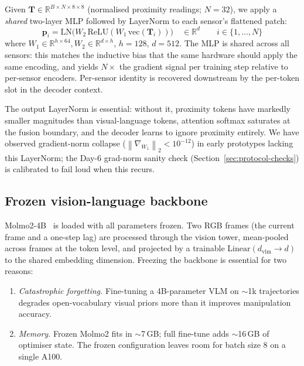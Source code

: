 \documentclass[11pt]{article}
\newcommand{\norm}[1]{\left\lVert#1\right\rVert}
\newcommand{\R}{\mathbb{R}}
\begin{document}
Given $\mathbf{T} \in \R^{B \times N \times 8 \times 8}$ (normalised
proximity readings; $N = 32$), we apply a \emph{shared} two-layer MLP
followed by LayerNorm to each sensor's flattened patch:
\begin{equation}
\mathbf{p}_i = \mathrm{LN}\big(W_2\, \mathrm{ReLU}(W_1\, \mathrm{vec}(\mathbf{T}_i)) \big)
\quad\in\R^{d}
\qquad i \in \{1, \dots, N\}
\end{equation}
where $W_1 \in \R^{h \times 64}, W_2 \in \R^{d \times h}$, $h = 128$,
$d = 512$. The MLP is shared across all sensors: this matches the
inductive bias that the same hardware should apply the same encoding,
and yields $N\times$ the gradient signal per training step relative to
per-sensor encoders. Per-sensor identity is recovered downstream by the
per-token slot in the decoder context.

The output LayerNorm is essential: without it, proximity tokens have
markedly smaller magnitudes than visual-language tokens, attention
softmax saturates at the fusion boundary, and the decoder learns to
ignore proximity entirely. We have observed gradient-norm collapse
($\norm{\nabla_{W_1}}_2 < 10^{-12}$) in early prototypes lacking this
LayerNorm; the Day-6 grad-norm sanity check
(Section~\ref{sec:protocol-checks}) is calibrated to fail loud when this
recurs.

\subsection{Frozen vision-language backbone}
\label{sec:method-vlm}

Molmo2-4B~\citep{molmo2024} is loaded with all parameters frozen. Two
RGB frames (the current frame and a one-step lag) are processed through
the vision tower, mean-pooled across frames at the token level, and
projected by a trainable $\mathrm{Linear}(d_\mathrm{vlm} \to d)$ to the
shared embedding dimension. Freezing the backbone is essential for two
reasons:
\begin{enumerate}[leftmargin=1.5em,topsep=0.2em,itemsep=0.2em]
\item \emph{Catastrophic forgetting.} Fine-tuning a 4B-parameter VLM on
  $\sim$1k trajectories degrades open-vocabulary visual priors more than
  it improves manipulation accuracy.
\item \emph{Memory.} Frozen Molmo2 fits in $\sim$7\,GB; full fine-tune
  adds $\sim$16\,GB of optimiser state. The frozen configuration leaves
  room for batch size 8 on a single A100.
\end{enumerate}
\end{document}
